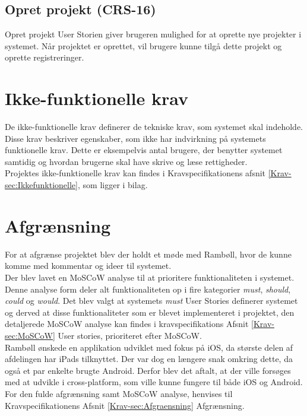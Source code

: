 	\subsection*{Opret projekt (CRS-16)}
	Opret projekt User Storien giver brugeren mulighed for at oprette nye projekter i systemet. Når projektet er oprettet, vil brugere kunne tilgå dette projekt og oprette registreringer. \\
	

\section{Ikke-funktionelle krav}
De ikke-funktionelle krav definerer de tekniske krav, som systemet skal indeholde. Disse krav beskriver egenskaber, som ikke har indvirkning på systemets funktionelle krav. Dette er eksempelvis antal brugere, der benytter systemet samtidig og hvordan brugerne skal have skrive og læse rettigheder. \\
Projektes ikke-funktionelle krav kan findes i Kravspecifikationens afsnit \ref{Krav-sec:Ikkefunktionelle}, som ligger i bilag. \\
\section{Afgrænsning}
For at afgrænse projektet blev der holdt et møde med Rambøll, hvor de kunne komme med kommentar og ideer til systemet. \\
Der blev lavet en MoSCoW analyse til at prioritere funktionaliteten i systemet. Denne analyse form deler alt funktionaliteten op i fire kategorier \emph{must}, \emph{should}, \emph{could} og \emph{would}.
Det blev valgt at systemets \emph{must} User Stories definerer systemet og derved at disse funktionaliteter som er blevet implementeret i projektet, den detaljerede MoSCoW analyse kan findes i kravspecifikations Afsnit \ref{Krav-sec:MoSCoW} User stories, prioriteret efter MoSCoW. \\
Rambøll ønskede en applikation udviklet med fokus på iOS, da største delen af afdelingen har iPads tilknyttet. Der var dog en længere snak omkring dette, da også et par enkelte brugte Android. Derfor blev det aftalt, at der ville forsøges med at udvikle i cross-platform, som ville kunne fungere til både iOS og Android.
For den fulde afgrænsning samt MoSCoW analyse, henvises til Kravspecifikationens Afsnit \ref{Krav-sec:Afgraensning} Afgrænsning.
	